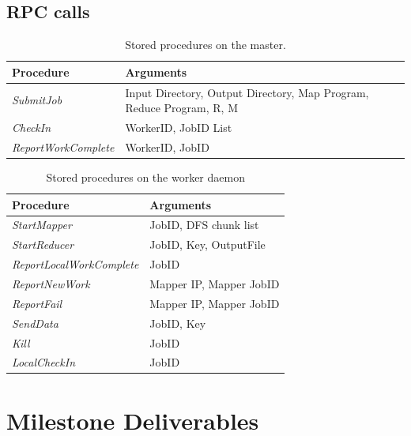 \documentclass[10pt,letter,final,article,twocolumn]{article} %
\newcommand{\rpc}[1]{\emph{#1}}
\begin{document}
\subsection{RPC calls}

\begin{table}[htdp]
\caption{Stored procedures on the master.}
\begin{center}
\begin{tabular}{|l|l|}\hline
\textbf{Procedure} & \textbf{Arguments}\\\hline
\rpc{SubmitJob} & Input Directory, Output Directory, Map Program, Reduce Program, R, M\\
\rpc{CheckIn} & WorkerID, JobID List\\
\rpc{ReportWorkComplete} & WorkerID, JobID\\\hline
\end{tabular}
\end{center}
\label{default}
\end{table}%

\begin{table}[htdp]
\caption{Stored procedures on the worker daemon}
\begin{center}
\begin{tabular}{|l|l|}\hline
\textbf{Procedure} & \textbf{Arguments}\\\hline
\rpc{StartMapper} & JobID, DFS chunk list \\
\rpc{StartReducer} & JobID, Key, OutputFile \\
\rpc{ReportLocalWorkComplete} & JobID\\
\rpc{ReportNewWork} & Mapper IP, Mapper JobID\\
\rpc{ReportFail} & Mapper IP, Mapper JobID\\
\rpc{SendData} & JobID, Key\\
\rpc{Kill} & JobID\\
\rpc{LocalCheckIn} & JobID\\\hline
\end{tabular}
\end{center}
\label{default}
\end{table}%



\section{Milestone Deliverables}



\end{document}

